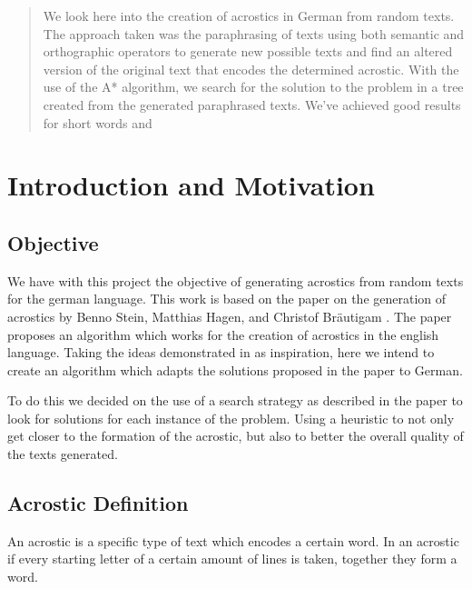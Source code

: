 \documentclass[11pt]{reportAlternative}
\begin{document}
\begin{abstract}
We look here into the creation of acrostics in German from random texts. The approach taken was the paraphrasing of texts using both semantic and orthographic operators to generate new possible texts and find an altered version of the original text that encodes the determined acrostic. With the use of the A* algorithm, we search for the solution to the problem in a tree created from the generated paraphrased texts. We've achieved good results for short words and 
\end{abstract}

\chapter{Introduction and Motivation}
\section{Objective}
We have with this project the objective of generating acrostics from random texts for the german language. This work is based on the paper on the generation of acrostics by Benno Stein, Matthias Hagen, and Christof Bräutigam \cite{Stein}. The paper proposes an algorithm which works for the creation of acrostics in the english language. Taking the ideas demonstrated in \cite{Stein} as inspiration, here we intend to create an algorithm which adapts the solutions proposed in the paper to German. 

To do this we decided on the use of a search strategy as described in the paper to look for solutions for each instance of the problem. Using a heuristic to not only get closer to the formation of the acrostic, but also to better the overall quality of the texts generated.

\section{Acrostic Definition}
An acrostic is a specific type of text which encodes a certain word. In an acrostic if every starting letter of a certain amount of lines is taken, together they form a word.
\end{document}
